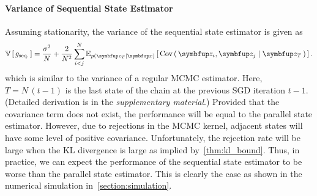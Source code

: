 \paragraph{Variance of Sequential State Estimator}
Assuming stationarity, the variance of the sequential state estimator is given as
\begin{align}
  \V{g_{\text{seq.}}} = \frac{\sigma^2}{N} + \frac{2}{N^2} \sum_{i < j}^N \Esub{p\left(\vz_T \mid \vx \right)}{ \Cov{ \vz_{i}, \vz_{j} \mid \vz_{T} } }\label{eq:var_seq}.
\end{align}
which is similar to the variance of a regular MCMC estimator.
Here, \(T = N\,\left(t - 1\right)\) is the last state of the chain at the previous SGD iteration \(t-1\).
(Detailed derivation is in the \textit{supplementary material}.)
Provided that the covariance term does not exist, the performance will be equal to the parallel state estimator.
However, due to rejections in the MCMC kernel, adjacent states will have some level of positive covariance.
Unfortunately, the rejection rate will be large when the KL divergence is large as implied by~\cref{thm:kl_bound}.
Thus, in practice, we can expect the performance of the sequential state estimator to be worse than the parallel state estimator.
This is clearly the case as shown in the numerical simulation in~\cref{section:simulation}.

%
%
%

%

